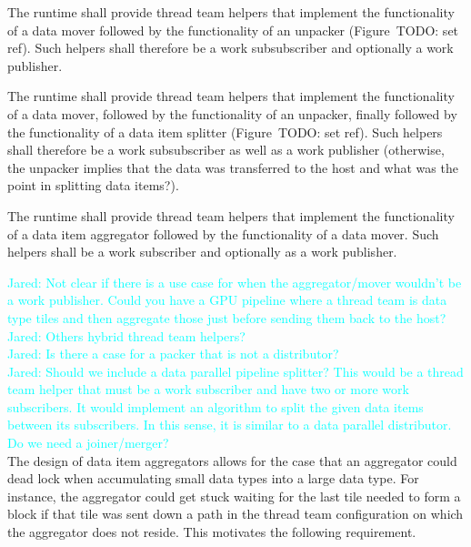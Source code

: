\documentclass{article}
\newcommand{\Jared}[1]          {\textcolor{cyan}{Jared: #1}}
\begin{document}
\begin{req}
The runtime shall provide thread team helpers that implement the functionality
of a data mover followed by the functionality of an unpacker
(Figure~TODO: set ref). %
Such helpers shall therefore be a work subsubscriber and
optionally a work publisher.
\end{req}

\begin{req}
The runtime shall provide thread team helpers that implement the functionality
of a data mover, followed by the functionality of an unpacker,
finally followed by the functionality of a data item splitter (Figure~TODO: set ref). %
Such helpers shall therefore be a work subsubscriber as well as a work
publisher (otherwise, the unpacker implies that the data was transferred to the
host and what was the point in splitting data items?).
\end{req}

\begin{req}
The runtime shall provide thread team helpers that implement the functionality
of a data item aggregator followed by the functionality of a data mover.  Such
helpers shall be a work subscriber and optionally as a work publisher.
\end{req}

\Jared{Not clear if there is a use case for when the aggregator/mover wouldn't
be a work publisher.  Could you have a GPU pipeline where a thread team is data
type tiles and then aggregate those just before sending them back to the
host?}\\

\Jared{Others hybrid thread team helpers?}\\

\Jared{Is there a case for a packer that is not a distributor?}\\

\Jared{Should we include a data parallel pipeline splitter?  This would be a
thread team helper that must be a work subscriber and have two or more work
subscribers.  It would implement an algorithm to split the given data items
between its subscribers.  In this sense, it is similar to a data parallel
distributor.  Do we need a joiner/merger?}\\

The design of data item aggregators allows for the case that an aggregator could
dead lock when accumulating small data types into a large data type.  For
instance, the aggregator could get stuck waiting for the last tile needed to form
a block if that tile was sent down a path in the thread team configuration on
which the aggregator does not reside.  This motivates the following requirement.
\end{document}
